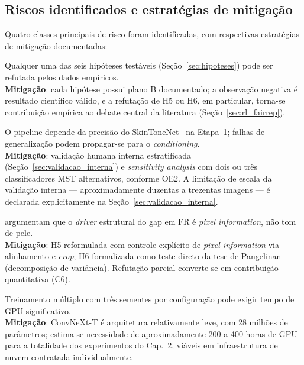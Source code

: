 \subsection{Riscos identificados e estratégias de mitigação}
\label{sec:riscos}

Quatro classes principais de risco foram identificadas, com respectivas estratégias de mitigação documentadas:

\begin{description}[font=\bfseries\sffamily]
\item[Risco~1 --- Refutação de hipóteses.] Qualquer uma das seis hipóteses testáveis (Seção~\ref{sec:hipoteses}) pode ser refutada pelos dados empíricos. \\
\textbf{Mitigação}: cada hipótese possui plano B documentado; a observação negativa é resultado científico válido, e a refutação de H5 ou H6, em particular, torna-se contribuição empírica ao debate central da literatura (Seção~\ref{sec:rl_fairrep}).

\item[Risco~2 --- Dependência do SkinToneNet como oráculo.] O pipeline depende da precisão do SkinToneNet~\autocite{matias2026large} na Etapa~1; falhas de generalização podem propagar-se para o \emph{conditioning}. \\
\textbf{Mitigação}: validação humana interna estratificada (Seção~\ref{sec:validacao_interna}) e \emph{sensitivity analysis} com dois ou três classificadores MST alternativos, conforme OE2. A limitação de escala da validação interna --- aproximadamente duzentas a trezentas imagens --- é declarada explicitamente na Seção~\ref{sec:validacao_interna}.

\item[Risco~3 --- Refutação parcial por \emph{pixel information}.] \textcite{pangelinan2023exploring} argumentam que o \emph{driver} estrutural do gap em FR é \emph{pixel information}, não tom de pele. \\
\textbf{Mitigação}: H5 reformulada com controle explícito de \emph{pixel information} via alinhamento e \emph{crop}; H6 formalizada como teste direto da tese de Pangelinan (decomposição de variância). Refutação parcial converte-se em contribuição quantitativa (C6).

\item[Risco~4 --- Limitação computacional.] Treinamento múltiplo com três sementes por configuração pode exigir tempo de GPU significativo. \\
\textbf{Mitigação}: ConvNeXt-T é arquitetura relativamente leve, com 28 milhões de parâmetros; estima-se necessidade de aproximadamente 200 a 400 horas de GPU para a totalidade dos experimentos do Cap.~2, viáveis em infraestrutura de nuvem contratada individualmente.
\end{description}

